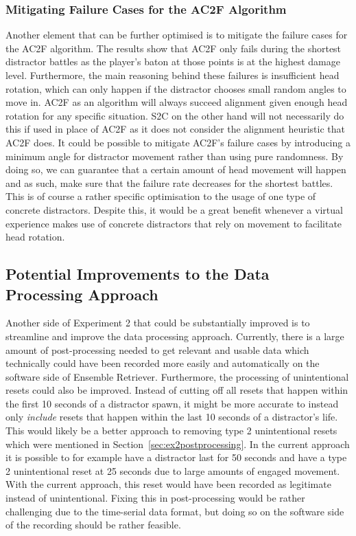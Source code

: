 \subsubsection{Mitigating Failure Cases for the AC2F Algorithm}
Another element that can be further optimised is to mitigate the failure cases for the AC2F algorithm. The results show that AC2F only fails during the shortest distractor battles as the player's baton at those points is at the highest damage level. Furthermore, the main reasoning behind these failures is insufficient head rotation, which can only happen if the distractor chooses small random angles to move in. AC2F as an algorithm will always succeed alignment given enough head rotation for any specific situation. S2C on the other hand will not necessarily do this if used in place of AC2F as it does not consider the alignment heuristic that AC2F does. It could be possible to mitigate AC2F's failure cases by introducing a minimum angle for distractor movement rather than using pure randomness. By doing so, we can guarantee that a certain amount of head movement will happen and as such, make sure that the failure rate decreases for the shortest battles. This is of course a rather specific optimisation to the usage of one type of concrete distractors. Despite this, it would be a great benefit whenever a virtual experience makes use of concrete distractors that rely on movement to facilitate head rotation. 

\subsection{Potential Improvements to the Data Processing Approach}\label{sec:improvingDataRecording}
Another side of Experiment 2 that could be substantially improved is to streamline and improve the data processing approach. Currently, there is a large amount of post-processing needed to get relevant and usable data which technically could have been recorded more easily and automatically on the software side of Ensemble Retriever. Furthermore, the processing of unintentional resets could also be improved. Instead of cutting off all resets that happen within the first 10 seconds of a distractor spawn, it might be more accurate to instead only \emph{include} resets that happen within the last 10 seconds of a distractor's life. This would likely be a better approach to removing type 2 unintentional resets which were mentioned in Section~\ref{sec:ex2postprocessing}. In the current approach it is possible to for example have a distractor last for 50 seconds and have a type 2 unintentional reset at 25 seconds due to large amounts of engaged movement. With the current approach, this reset would have been recorded as legitimate instead of unintentional. Fixing this in post-processing would be rather challenging due to the time-serial data format, but doing so on the software side of the recording should be rather feasible. 

